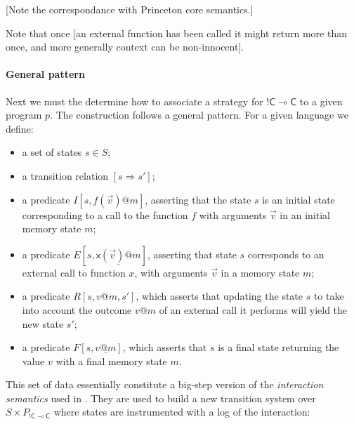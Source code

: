 \documentclass[acmsmall,anonymous]{acmart}
\makeatletter
\newcommand{\kw}[1]{\ensuremath{ \textsf{#1} }}
\newcommand{\EC}{\kw{C}}
\newcommand{\mcall}[3]{\kw{#1}({#2})@{#3}}
\newcommand{\pcall}[3]{%
  \underline{\mcall{#1}{#2}{#3}}%
}
\newcommand{\mret}[2]{{#1}@{#2}}
\newcommand{\pret}[2]{%
  \underline{\mret{#1}{#2}}%
}
\makeatother
\begin{document}
[Note the correspondance with Princeton core semantics.]

Note that once [an external function has been called
it might return more than once,
and more generally context can be non-innocent].


\paragraph{General pattern} %

Next we must the determine how to associate a strategy for $!\EC \multimap \EC$
to a given program $p$.
The construction follows a general pattern.
For a given language we define:
\begin{itemize}
  \item a set of states $s \in S$;
  \item a transition relation $[s \Rightarrow s']$;
  \item a predicate $I[s, f(\vec{v})@m]$,
    asserting that the state $s$ is an initial state
    corresponding to a call to the function $f$
    with arguments $\vec{v}$
    in an initial memory state $m$;
  \item a predicate $E[s, \pcall{x}{\vec{v}}{m}]$,
    asserting that state $s$
    corresponds to an external call to function $x$,
    with arguments $\vec{v}$
    in a memory state $m$;
  \item a predicate $R[s, \mret{v}{m}, s']$,
    which asserts that updating the state $s$
    to take into account the outcome $v@m$
    of an external call it performs
    will yield the new state $s'$;
  \item a predicate $F[s, \pret{v}{m}]$,
    which asserts that $s$
    is a final state
    returning the value $v$
    with a final memory state $m$.
\end{itemize}
This set of data
essentially constitute a big-step version of
the \emph{interaction semantics} used in \citep{compcompcert}.
They are used to build a new transition system
over $S \times P_{!\EC \multimap \EC}$
where states are instrumented with a log of the interaction:
\end{document}
